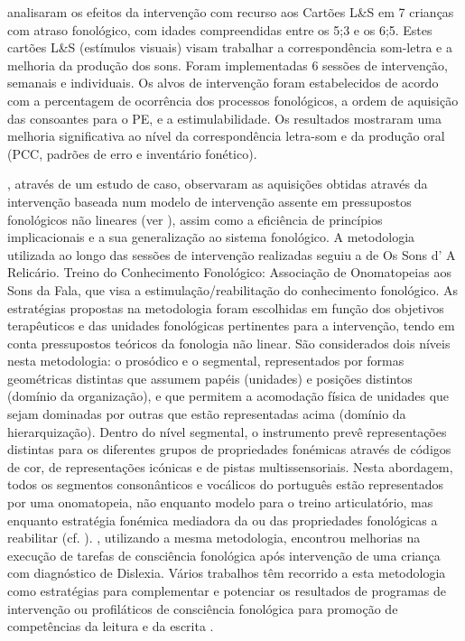 \documentclass[output=paper,colorlinks,citecolor=brown,booklanguage=portuguese]{langscibook}
\begin{document}
\citet{Pedro2018} analisaram os efeitos da intervenção com recurso aos Cartões L\&S em 7 crianças com atraso fonológico, com idades compreendidas entre os 5;3 e os 6;5. Estes cartões L\&S (estímulos visuais) visam trabalhar a correspondência som-letra e a melhoria da produção dos sons. Foram implementadas 6 sessões de intervenção, semanais e individuais. Os alvos de intervenção foram estabelecidos de acordo com a percentagem de ocorrência dos processos fonológicos, a ordem de aquisição das consoantes para o PE, e a estimulabilidade. Os resultados mostraram uma melhoria significativa ao nível da correspondência letra-som e da produção oral (PCC, padrões de erro e inventário fonético).

\citet{Alves2018}, através de um estudo de caso, observaram as aquisições obtidas através da intervenção baseada num modelo de intervenção assente em pressupostos fonológicos não lineares (ver ), assim como a eficiência de princípios implicacionais e a sua generalização ao sistema fonológico. A metodologia utilizada ao longo das sessões de intervenção realizadas seguiu a de Os Sons d’ A Relicário. Treino do Conhecimento Fonológico: Associação de Onomatopeias aos Sons da Fala, que visa a estimulação/reabilitação do conhecimento fonológico. As estratégias propostas na metodologia foram escolhidas em função dos objetivos terapêuticos e das unidades fonológicas pertinentes para a intervenção, tendo em conta pressupostos teóricos da fonologia não linear. São considerados dois níveis nesta metodologia: o prosódico e o segmental, representados por formas geométricas distintas que assumem papéis (unidades) e posições distintos (domínio da organização), e que permitem a acomodação física de unidades que sejam dominadas por outras que estão representadas acima (domínio da hierarquização). Dentro do nível segmental, o instrumento prevê representações distintas para os diferentes grupos de propriedades fonémicas através de códigos de cor, de representações icónicas e de pistas multissensoriais. Nesta abordagem, todos os segmentos consonânticos e vocálicos do português estão representados por uma onomatopeia, não enquanto modelo para o treino articulatório, mas enquanto estratégia fonémica mediadora da ou das propriedades fonológicas a reabilitar (cf. ). \citet{Costa2013}, utilizando a mesma metodologia, encontrou melhorias na execução de tarefas de consciência fonológica após intervenção de uma criança com diagnóstico de Dislexia. Vários trabalhos têm recorrido a esta metodologia como estratégias para complementar e potenciar os resultados de programas de intervenção ou profiláticos de consciência fonológica para promoção de competências da leitura e da escrita \citep{Freitas2007, Cysne2012}. 
\end{document}
